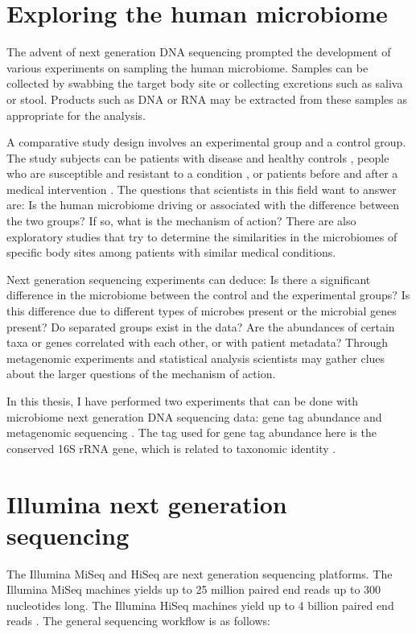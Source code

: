 \section{Exploring the human microbiome}
The advent of next generation DNA sequencing prompted the development of various experiments on sampling the human microbiome. Samples can be collected by swabbing the target body site or collecting excretions such as saliva or stool. Products such as DNA or RNA may be extracted from these samples as appropriate for the analysis.

A comparative study design involves an experimental group and a control group. The study subjects can be patients with disease and healthy controls \cite{macklaim2013comparative}, people who are susceptible and resistant to a condition \cite{theriot2014antibiotic}, or patients before and after a medical intervention \cite{graessler2013metagenomic}. The questions that scientists in this field want to answer are: Is the human microbiome driving or associated with the difference between the two groups? If so, what is the mechanism of action? There are also exploratory studies that try to determine the similarities in the microbiomes of specific body sites among patients with similar medical conditions.

Next generation sequencing experiments can deduce: Is there a significant difference in the microbiome between the control and the experimental groups? Is this difference due to different types of microbes present or the microbial genes present? Do separated groups exist in the data? Are the abundances of certain taxa or genes correlated with each other, or with patient metadata? Through metagenomic experiments and statistical analysis scientists may gather clues about the larger questions of the mechanism of action.

In this thesis, I have performed two experiments that can be done with microbiome next generation DNA sequencing data: gene tag abundance and metagenomic sequencing \cite{riesenfeld2004metagenomics}. The tag used for gene tag abundance here is the conserved 16S rRNA gene, which is related to taxonomic identity \cite{gloor2010microbiome}.

\section{Illumina next generation sequencing}
The Illumina MiSeq and HiSeq are next generation sequencing platforms. The Illumina MiSeq machines yields up to 25 million paired end reads up to 300 nucleotides long. The Illumina HiSeq machines yield up to 4 billion paired end reads \cite{bentley2008accurate}. The general sequencing workflow is as follows:

